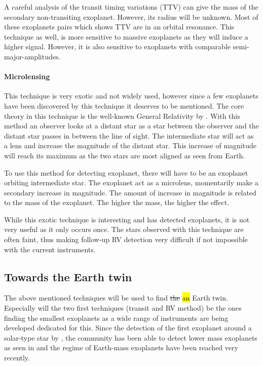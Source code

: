 A careful analysis of the transit timing variations (TTV) can give the mass of the secondary
non-transiting exoplanet. However, its radius will be unknown. Most of these exoplanets pairs which
shows TTV are in an orbital resonance. This technique as well, is more sensitive to massive
exoplanets as they will induce a higher signal. However, it is also sensitive to exoplanets with
comparable semi-major-amplitudes.


\paragraph{Microlensing}

This technique is very exotic and not widely used, however since a few exoplanets have been
discovered by this technique it deserves to be mentioned. The core theory in this technique is the
well-known General Relativity by \citet{Einstein1916}. With this method an observer looks at a
distant star as a star between the observer and the distant star passes in between the line of
sight. The intermediate star will act as a lens and increase the magnitude of the distant star. This
increase of magnitude will reach its maximum as the two stars are most aligned as seen from Earth.

To use this method for detecting exoplanet, there will have to be an exoplanet orbiting intermediate
star. The exoplanet act as a microlens, momentarily make a secondary increase in magnitude. The
amount of increase in magnitude is related to the mass of the exoplanet. The higher the mass, the
higher the effect.

While this exotic technique is interesting and has detected exoplanets, it is not very useful as it
only occurs once. The stars observed with this technique are often faint, thus making follow-up RV
detection very difficult if not impossible with the current instruments.


\subsection{Towards the Earth twin}

The above mentioned techniques will be used to find \st{the} \hl{an} Earth twin. Especially will the
two first techniques (transit and RV method) be the ones finding the smallest exoplanets as a wide
range of instruments are being developed dedicated for this. Since the detection of the first
exoplanet around a solar-type star by \citet{Mayor1995}, the community has been able to detect lower
mass exoplanets as seen in  and the regime of Earth-mass exoplanets have
been reached very recently.


